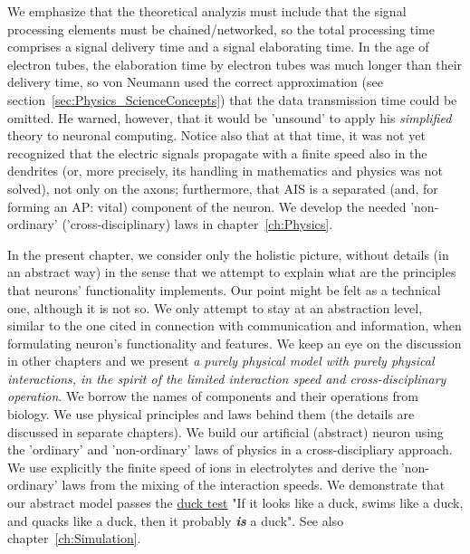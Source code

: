 We emphasize that the theoretical analyzis must include
that the signal processing elements must be chained/networked,
so the total processing time comprises a signal delivery time
and a signal elaborating time.
In the age of electron tubes, the elaboration time by electron tubes was much longer than their delivery time,
so von Neumann used the correct approximation (see section~\ref{sec:Physics_ScienceConcepts}) that the data transmission time could be omitted.
He warned, however, that it would be 'unsound' to apply 
his \textit{simplified} theory to neuronal computing.
Notice also that at that time,
it was not yet recognized that the electric signals propagate
with a finite speed also in the dendrites (or, more precisely,
its handling in mathematics and physics was not solved), not only on the axons; furthermore, that \gls{AIS}
is a separated (and, for forming an \gls{AP}:
vital) component of the neuron.
We develop the needed 'non-ordinary' ('cross-disciplinary) laws in chapter~\ref{ch:Physics}.



In the present chapter, we consider only
the holistic picture, without details (in an abstract way) 
in the sense that we attempt to explain what are the principles that 
neurons' functionality implements. Our point might be felt as a technical one,
although it is not so. We only attempt to stay at an abstraction level, similar to the one cited in connection 
with %
{communication and information}, when formulating neuron's 
functionality and features. 
We keep an eye on the discussion in other chapters and 
we present \textit{a purely physical model with purely physical interactions, in the spirit of the limited interaction speed and cross-disciplinary operation}.
We borrow the names of components and their operations from biology. 
We use physical principles and laws  behind them (the details are discussed in separate chapters). 
We build our artificial (abstract) neuron using
the 'ordinary' and 'non-ordinary' laws of physics in a cross-discipliary approach. We use 
explicitly the finite speed of ions in electrolytes and derive
the 'non-ordinary' laws from the mixing of the interaction speeds.
We demonstrate that our abstract model passes the \href{https://en.wikipedia.org/wiki/Duck_test}{duck test}
"If it looks like a duck, swims like a duck, and quacks like a duck,
then it probably \textbf{\textit{is}} a duck". See also
chapter~\ref{ch:Simulation}.


